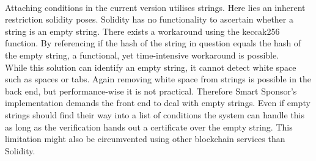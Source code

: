\\
Attaching conditions in the current version utilises strings. Here lies an inherent restriction solidity poses. Solidity has no functionality to ascertain whether a string is an empty string. There exists a workaround using the keccak256 function. By referencing if the hash of the string in question equals the hash of the empty string, a functional, yet time-intensive workaround is possible.\\
While this solution can identify an empty string, it cannot detect white space such as spaces or tabs. Again removing white space from strings is possible in the back end, but performance-wise it is not practical. Therefore Smart Sponsor's implementation demands the front end to deal with empty strings. Even if empty strings should find their way into a list of conditions the system can handle this as long as the verification hands out a certificate over the empty string. This limitation might also be circumvented using other blockchain services than Solidity.
